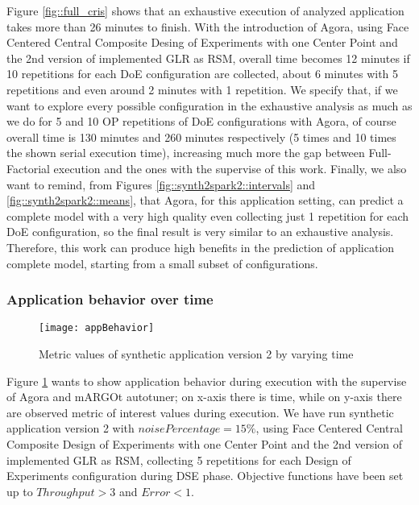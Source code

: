 Figure \ref{fig::full_cris} shows that an exhaustive execution of analyzed application takes more than 26 minutes to finish. With the introduction of Agora, using Face Centered Central Composite Desing of Experiments with one Center Point and the 2nd version of implemented GLR as RSM, overall time becomes 12 minutes if 10 repetitions for each DoE configuration are collected, about 6 minutes with 5 repetitions and even around 2 minutes with 1 repetition. We specify that, if we want to explore every possible configuration in the exhaustive analysis as much as we do for 5 and 10 OP repetitions of DoE configurations with Agora, of course overall time is 130 minutes and 260 minutes respectively (5 times and 10 times the shown serial execution time), increasing much more the gap between Full-Factorial execution and the ones with the supervise of this work. Finally, we also want to remind, from Figures \ref{fig::synth2spark2::intervals} and \ref{fig::synth2spark2::means}, that Agora, for this application setting, can predict a complete model with a very high quality even collecting just 1 repetition for each DoE configuration, so the final result is very similar to an exhaustive analysis. Therefore, this work can produce high benefits in the prediction of application complete model, starting from a small subset of configurations.


\subsubsection{Application behavior over time}

\begin{figure}[htb]

    \centering
    \texttt{[image: appBehavior]}
    \caption{Metric values of synthetic application version 2 by varying time}
    \label{fig::appBeh}
    
\end{figure}

Figure \ref{fig::appBeh} wants to show application behavior during execution with the supervise of Agora and mARGOt autotuner; on x-axis there is time, while on y-axis there are observed metric of interest values during execution. We have run synthetic application version 2 with $noisePercentage = 15\%$, using Face Centered Central Composite Design of Experiments with one Center Point and the 2nd version of implemented GLR as RSM, collecting 5 repetitions for each Design of Experiments configuration during DSE phase. Objective functions have been set up to $Throughput > 3$ and $Error < 1$.

